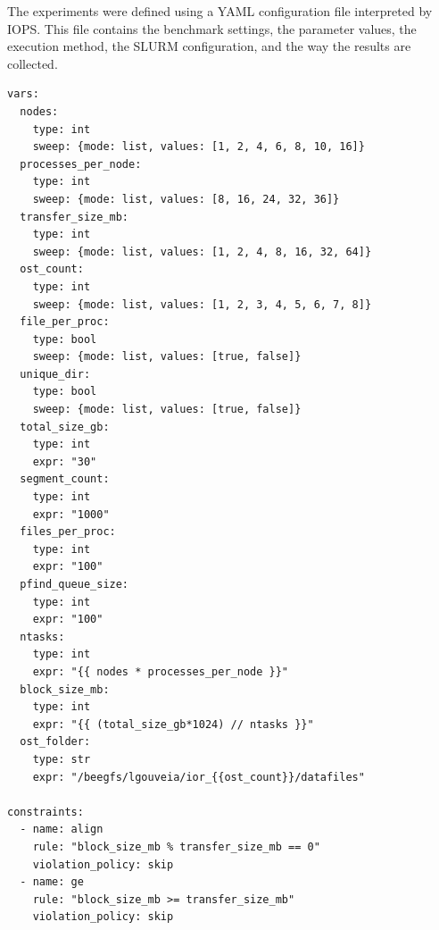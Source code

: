 The experiments were defined using a YAML configuration file interpreted
by IOPS. This file contains the benchmark settings, the parameter values,
the execution method, the SLURM configuration, and the way the results
are collected.


\begin{verbatim}
vars:
  nodes:
    type: int
    sweep: {mode: list, values: [1, 2, 4, 6, 8, 10, 16]}
  processes_per_node:
    type: int
    sweep: {mode: list, values: [8, 16, 24, 32, 36]}
  transfer_size_mb:
    type: int
    sweep: {mode: list, values: [1, 2, 4, 8, 16, 32, 64]}
  ost_count:
    type: int
    sweep: {mode: list, values: [1, 2, 3, 4, 5, 6, 7, 8]}
  file_per_proc:
    type: bool
    sweep: {mode: list, values: [true, false]}
  unique_dir:
    type: bool
    sweep: {mode: list, values: [true, false]}
  total_size_gb:
    type: int
    expr: "30"
  segment_count:
    type: int
    expr: "1000"
  files_per_proc:
    type: int
    expr: "100"
  pfind_queue_size:
    type: int
    expr: "100"
  ntasks:
    type: int
    expr: "{{ nodes * processes_per_node }}"
  block_size_mb:
    type: int
    expr: "{{ (total_size_gb*1024) // ntasks }}"
  ost_folder:
    type: str
    expr: "/beegfs/lgouveia/ior_{{ost_count}}/datafiles"

constraints:
  - name: align
    rule: "block_size_mb % transfer_size_mb == 0"
    violation_policy: skip
  - name: ge
    rule: "block_size_mb >= transfer_size_mb"
    violation_policy: skip
\end{verbatim}


